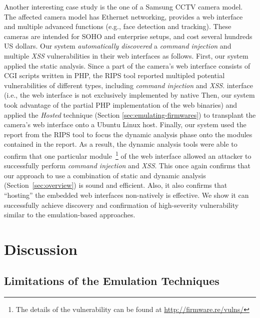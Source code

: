 \documentclass[conference]{./templates/ndss/IEEEtran}
\newcounter{t0d0_counter}
\newcounter{pr00f_counter}
\begin{document}
Another interesting case study is the one of a Samsung CCTV camera model. 
The affected camera model has Ethernet networking, provides a web interface 
and multiple advanced functions (e.g., face detection and tracking). 
These cameras are intended for SOHO and enterprise setups, and cost several 
hundreds US dollars. 
    Our system \emph{automatically discovered} a \emph{command injection} and 
multiple \emph{XSS} vulnerabilities in their web interfaces as follows. 
    First, our system applied the static analysis. Since a part of the camera's 
web interface consists of CGI scripts written in PHP, the RIPS tool reported 
multipled potential vulnerabilities of different types, including 
\emph{command injection} and \emph{XSS}. 
interface (i.e., the web interface is not exclusively implemented by native 
    Then, our system took advantage of the partial PHP implementation of the web 
binaries) and applied the \emph{Hosted} technique (Section \ref{sec:emulating-firmwares}) 
to transplant the camera's web interface onto a Ubuntu Linux host. 
    Finally, our system used the report from the RIPS tool to focus the dynamic 
analysis phase onto the modules contained in the report. As a result, the dynamic 
analysis tools were able to confirm that one particular 
module~\footnote{The details of the vulnerability can be found at 
\url{http://firmware.re/vulns/}} of the web interface allowed an attacker 
to successfully perform \emph{command injection} and \emph{XSS}. 
    This once again confirms that our approach to use a combination of static and 
dynamic analysis (Section~\ref{sec:overview}) is sound and efficient. Also, 
it also confirms that ``hosting'' the embedded web interfaces non-natively 
is effective. We show it can successfully achieve discovery and confirmation 
of high-severity vulnerability similar to the emulation-based approaches. 




\section{Discussion}
\label{sec:discussions}


\subsection{Limitations of the Emulation Techniques}
\label{sec:discuss-limit}
\end{document}

